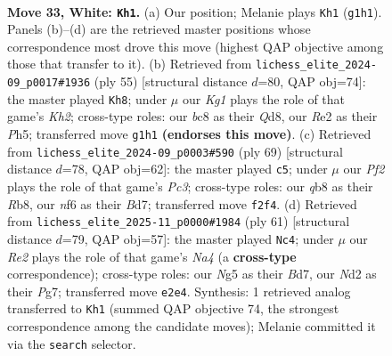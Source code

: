\documentclass[11pt]{article}
\begin{document}
\clearpage

\begin{figure}[p]\centering
\begin{subfigure}{0.46\textwidth}\centering
\resizebox{\linewidth}{!}{%
\newchessgame
\chessboard[
  setfen={1qb5/r4pk1/2B2np1/6Np/P7/1p4P1/3NRP1P/R5K1 w - - 0 33},
  showmover=false,
  pgfstyle=straightmove, color=movearrow, markmove={g1-h1}
]}
\caption{}
\end{subfigure}\hfill
\begin{subfigure}{0.46\textwidth}\centering
\resizebox{\linewidth}{!}{%
\newchessgame
\chessboard[
  setfen={1r1q4/5r1k/1p5p/2pn3p/4N3/4P2P/1RQ2PP1/5RK1 b - - 1 28},
  showmover=false,
  pgfstyle=straightmove, color=movearrow, markmove={h7-h8}
]}
\caption{}
\end{subfigure}
\\[4pt]
\begin{subfigure}{0.46\textwidth}\centering
\resizebox{\linewidth}{!}{%
\newchessgame
\chessboard[
  setfen={1r6/3b1pk1/2pPppr1/8/p2Q4/3P2P1/5P1P/4R1K1 b - - 0 35},
  showmover=false,
  pgfstyle=straightmove, color=movearrow, markmove={c6-c5}
]}
\caption{}
\end{subfigure}\hfill
\begin{subfigure}{0.46\textwidth}\centering
\resizebox{\linewidth}{!}{%
\newchessgame
\chessboard[
  setfen={8/3bkpp1/1r5p/nprp4/6P1/P3P2P/1RN1BPK1/3R4 b - - 4 31},
  showmover=false,
  pgfstyle=straightmove, color=movearrow, markmove={a5-c4}
]}
\caption{}
\end{subfigure}
\caption{\textbf{Move 33, White: \texttt{Kh1}.} (a) Our position; Melanie plays \texttt{Kh1} (\texttt{g1h1}). Panels (b)--(d) are the retrieved master positions whose correspondence most drove this move (highest QAP objective among those that transfer to it). (b) Retrieved from \texttt{lichess\_elite\_2024-09\_p0017\#1936} (ply 55) [structural distance $d$=80, QAP obj=74]: the master played \texttt{Kh8}; under $\mu$ our \emph{Kg1} plays the role of that game's \emph{Kh2}; cross-type roles: our \emph{b}c8 as their \emph{Q}d8, our \emph{R}e2 as their \emph{P}h5; transferred move \texttt{g1h1} \textbf{(endorses this move)}. (c) Retrieved from \texttt{lichess\_elite\_2024-09\_p0003\#590} (ply 69) [structural distance $d$=78, QAP obj=62]: the master played \texttt{c5}; under $\mu$ our \emph{Pf2} plays the role of that game's \emph{Pc3}; cross-type roles: our \emph{q}b8 as their \emph{R}b8, our \emph{n}f6 as their \emph{B}d7; transferred move \texttt{f2f4}. (d) Retrieved from \texttt{lichess\_elite\_2025-11\_p0000\#1984} (ply 61) [structural distance $d$=79, QAP obj=57]: the master played \texttt{Nc4}; under $\mu$ our \emph{Re2} plays the role of that game's \emph{Na4} (a \textbf{cross-type} correspondence); cross-type roles: our \emph{N}g5 as their \emph{B}d7, our \emph{N}d2 as their \emph{P}g7; transferred move \texttt{e2e4}. Synthesis: 1 retrieved analog transferred to \texttt{Kh1} (summed QAP objective 74, the strongest correspondence among the candidate moves); Melanie committed it via the \texttt{search} selector.}
\label{fig:thought-m64}
\end{figure}
\end{document}

